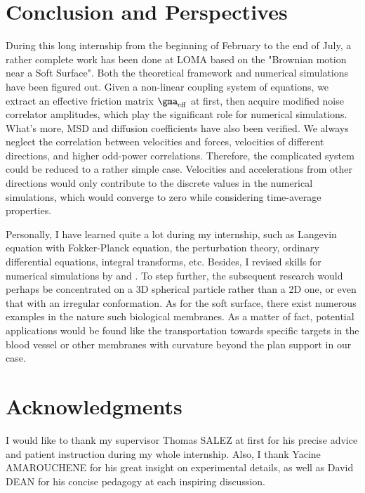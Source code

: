 \documentclass[fleqn,10pt]{InternshipReport-ENS-PSL}
\begin{document}
\section*{Conclusion and Perspectives} 

During this long internship from the beginning of February to the end of July, a rather complete work has been done at LOMA based on the "Brownian motion near a Soft Surface". Both the theoretical framework and numerical simulations have been figured out. Given a non-linear coupling system of equations, we extract an effective friction matrix $\gma_{\mrm{eff}}$ at first, then acquire modified noise correlator amplitudes, which play the significant role for numerical simulations. What's more, MSD and diffusion coefficients have also been verified. We always neglect the correlation between velocities and forces, velocities of different directions, and higher odd-power correlations. Therefore, the complicated system could be reduced to a rather simple case. Velocities and accelerations from other directions would only contribute to the discrete values in the numerical simulations, which would converge to zero while considering time-average properties.

Personally, I have learned quite a lot during my internship, such as Langevin equation with Fokker-Planck equation, the perturbation theory, ordinary differential equations, integral transforms, etc. Besides, I revised skills for numerical simulations by  and . To step further, the subsequent research would perhaps be concentrated on a 3D spherical particle rather than a 2D one, or even that with an irregular conformation. As for the soft surface, there exist numerous examples in the nature such biological membranes. As a matter of fact, potential applications would be found like the transportation towards specific targets in the blood vessel or other membranes with curvature beyond the plan support in our case.






\section*{Acknowledgments} 

I would like to thank my supervisor Thomas SALEZ at first for his precise advice and patient instruction during my whole internship. Also, I thank Yacine AMAROUCHENE for his great insight on experimental details, as well as David DEAN for his concise pedagogy at each inspiring discussion. 
\end{document}
